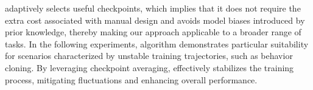 \begin{remark}
\method{} adaptively selects useful checkpoints, which implies that it does not require the extra cost associated with manual design and avoids model biases introduced by prior knowledge, thereby making our approach applicable to a broader range of tasks. In the following experiments, \method{} algorithm demonstrates particular suitability for scenarios characterized by unstable training trajectories, such as behavior cloning. By leveraging checkpoint averaging, \method{} effectively stabilizes the training process, mitigating fluctuations and enhancing overall performance.
\end{remark}
